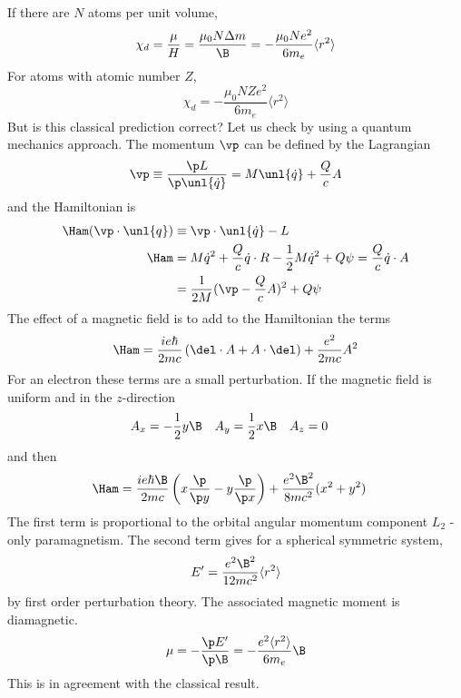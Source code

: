 \documentclass[a4paper, 11pt, normalem]{report}
\begin{document}
If there are $N$ atoms per unit volume, 
\begin{equation}
    \chi_d = \frac{\mu}{H} = \frac{\mu_0N\Delta m}{\B} = -\frac{\mu_0Ne^2}{6m_e}\langle r^2\rangle
\end{equation}
For atoms with atomic number $Z$,
\begin{equation}
    \chi_d = -\frac{\mu_0NZe^2}{6m_e}\langle r^2\rangle
\end{equation}
But is this classical prediction correct?
Let us check by using a quantum mechanics approach. 
The momentum $\vp$ can be defined by the Lagrangian
\begin{equation}
    \vp \equiv \frac{\p L}{\p \unl{\dot{q}}} = M\unl{\dot{q}} + \frac{Q}{c}A
\end{equation}
and the Hamiltonian is
\begin{align}
    \Ham(\vp\cdot\unl{q}) &\equiv \vp\cdot\unl{\dot{q}} - L \\
    \Ham &= M\dot{q}^2 + \frac{Q}{c}\dot{q}\cdot R - \frac12M\dot{q}^2 + Q\psi = \frac{Q}{c}\dot{q}\cdot A \\
         &= \frac{1}{2M}(\vp - \frac{Q}{c}A)^2 + Q\psi
\end{align}
The effect of a magnetic field is to add to the Hamiltonian the terms
\begin{equation}
    \Ham = \frac{ie\hbar}{2mc}\left(\del\cdot A + A\cdot\del\right) + \frac{e^2}{2mc}A^2
\end{equation}
For an electron these terms are a small perturbation. 
If the magnetic field is uniform and in the $z$-direction
\begin{align}
    A_x &= -\frac12 y\B & A_y &= \frac12 x\B & A_z &= 0 
\end{align}
and then
\begin{align}
    \Ham &= \frac{ie\hbar\B}{2mc}\left(x\frac{\p}{\p y} - y\frac{\p}{\p x}\right) + \frac{e^2\B^2}{8mc^2}(x^2+y^2) 
\end{align}
The first term is proportional to the orbital angular momentum component $L_2$ - only paramagnetism. 
The second term gives for a spherical symmetric system, 
\begin{equation}
    E' = \frac{e^2\B^2}{12mc^2}\langle r^2\rangle
\end{equation}
by first order perturbation theory. 
The associated magnetic moment is diamagnetic. 
\begin{equation}
    \mu = -\frac{\p E'}{\p\B} = -\frac{e^2\langle r^2\rangle}{6m_e}\B
\end{equation}
This is in agreement with the classical result. 
\end{document}
